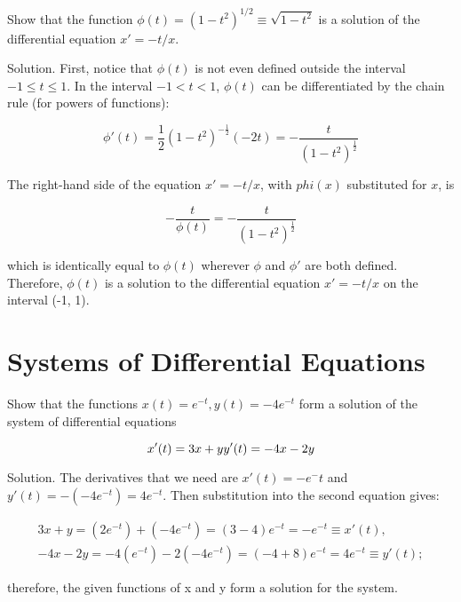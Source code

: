     \begin{problem}
      Show that the function $\phi(t)=(1-t^2)^{1/2}\equiv\sqrt{1-t^2}$ is a solution of the differential equation $x'=-t/x$.

      Solution. First, notice that $\phi(t)$ is not even defined outside the interval $-1\le t\le 1$. In the interval $-1<t<1$, $\phi(t)$ can be differentiated by the chain rule (for powers of functions):

      \begin{equation}
        \phi'(t) =\frac{1}{2}(1 - t^2)^{ - \frac{1}{2}}( - 2t) =- \frac{t}{(1 - t^2)^{\frac{1}{2}}}
      \end{equation}

      The right-hand side of the equation $x'=-t/x$, with $phi(x)$ substituted for $x$, is 

      \begin{equation}
        - \frac{t}{\phi (t)} =- \frac{t}{(1 - t^2)^{\frac{1}{2}}}
      \end{equation}

      which is identically equal to $\phi(t)$ wherever $\phi$ and $\phi'$ are both defined. Therefore, $\phi(t)$ is a solution to the differential equation $x'=-t/x$ on the interval (-1, 1).
    \end{problem}

\section{Systems of Differential Equations}

  \begin{problem}
    Show that the functions $x(t)=e^{-t},y(t)=-4e^{-t}$ form a solution of the system of differential equations

    \begin{equation}
      x'(t) = 3x + y\newline
      y'(t) =- 4x - 2y
    \end{equation}

    Solution. The derivatives that we need are $x'(t)=-e^-t$ and $y'(t)=-(-4e^{-t})=4e^{-t}$. Then substitution into the second equation gives:

    \begin{align}
      3x+y=(2e^{-t})+(-4e^{-t})=(3-4)e^{-t}=-e^{-t}\equiv x'(t),\\
      -4x-2y=-4(e^{-t})-2(-4e^{-t})=(-4+8)e^{-t}=4e^{-t}\equiv y'(t);
    \end{align}

    therefore, the given functions of x and y form a solution for the system.
  \end{problem}

